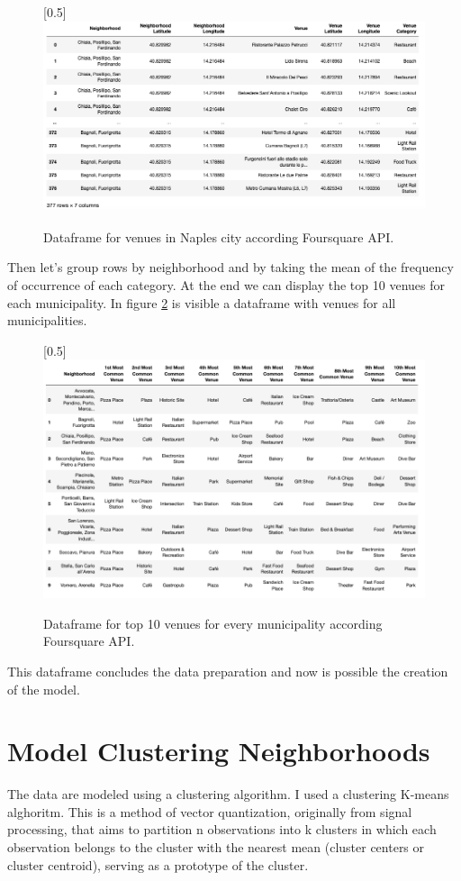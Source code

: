 \documentclass[a4paper, 12pt, oneside]{book}
\begin{document}
\begin{figure}[!htb]
		\centering
		\scalebox{0.45}[0.5]{\includegraphics{immagini/explore.png}}
		\caption{Dataframe for venues in Naples city according Foursquare API.}
		\label{fig:explore}
	\end{figure}

Then let's group rows by neighborhood and by taking the mean of the frequency of occurrence of each category. At the end we can display the top 10 venues for each municipality. In figure \ref{fig:venues} is visible a dataframe with venues for all municipalities.\\

\begin{figure}[!htb]
		\centering
		\scalebox{0.5}[0.5]{\includegraphics{immagini/venues.png}}
		\caption{Dataframe for top 10 venues for every municipality according Foursquare API.}
		\label{fig:venues}
	\end{figure}


This dataframe concludes the data preparation and now is possible the creation of the model.


\chapter*{Model Clustering Neighborhoods}
\label{ch:modelClustering}
The data are modeled using a clustering algorithm. I used a clustering K-means alghoritm. This is a method of vector quantization, originally from signal processing, that aims to partition n observations into k clusters in which each observation belongs to the cluster with the nearest mean (cluster centers or cluster centroid), serving as a prototype of the cluster\cite{clustering}.\\
\end{document}
